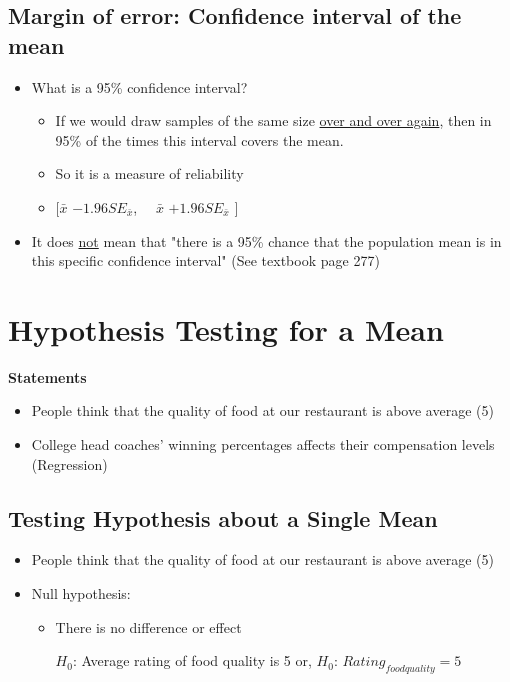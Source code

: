 \documentclass[10pt,article]{article}
\begin{document}
\subsection{Margin of error: Confidence interval of the mean}
\label{sec:org37ddc6b}
\begin{itemize}
\item What is a 95\% confidence interval?
\begin{itemize}
\item If we would draw samples of the same size \uline{over and over again}, then in 95\%
of the times this interval covers the mean.
\item So it is a measure of reliability
\item \([ \bar{x}\)  \(- 1.96 SE_{\bar{x}} \), \(\quad \bar{x}\)
 \( + 1.96 SE_{\bar{x}} \) \(]\)
\end{itemize}

\item It does \uline{not} mean that "there is a 95\% chance that the population mean is
in this specific confidence interval" (See textbook page 277)
\end{itemize}
\section{Hypothesis Testing for a Mean}
\label{sec:org71e62c1}
\textbf{Statements}

\begin{itemize}
\item People think that the quality of food at our restaurant is above average (5)

\item College head coaches' winning percentages affects their compensation levels
(Regression)
\end{itemize}
\subsection{Testing Hypothesis about a Single Mean}
\label{sec:org1241d4d}
\begin{itemize}
\item People think that the quality of food at our restaurant is above average (5)

\item Null hypothesis:
\begin{itemize}
\item There is no difference or effect 

\(H_0\): Average rating of food quality is 5 or, 
\(H_0\): \(Rating_{foodquality} = 5\)
\end{itemize}
\end{itemize}
\end{document}
